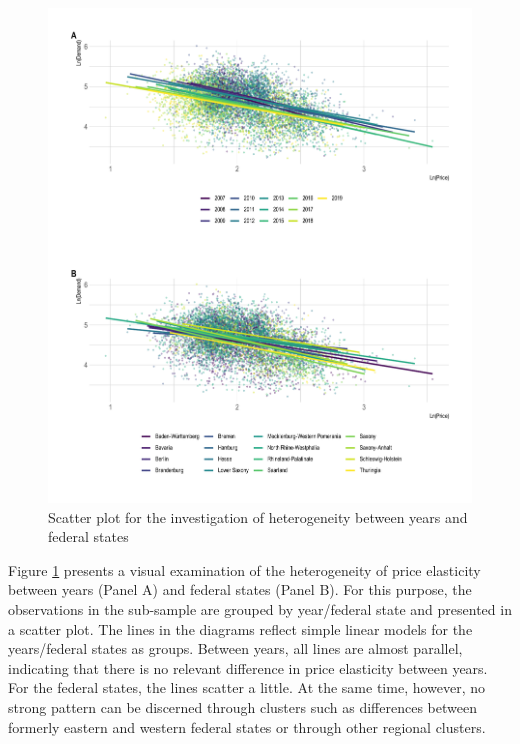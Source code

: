 \documentclass[12pt,twoside]{reedthesis}
\begin{document}
\newpage
\begin{figure}

{\centering \includegraphics[width=1\linewidth]{figure/year_state_heterogeneity_plot} 

}

\caption{Scatter plot for the investigation of heterogeneity between years and federal states}\label{fig:heterogeneity-year-state-plot}
\end{figure}
\noindent
Figure \ref{fig:heterogeneity-year-state-plot} presents a visual examination of the heterogeneity of price elasticity between years (Panel A) and federal states (Panel B). For this purpose, the observations in the sub-sample are grouped by year/federal state and presented in a scatter plot. The lines in the diagrams reflect simple linear models for the years/federal states as groups. Between years, all lines are almost parallel, indicating that there is no relevant difference in price elasticity between years. For the federal states, the lines scatter a little. At the same time, however, no strong pattern can be discerned through clusters such as differences between formerly eastern and western federal states or through other regional clusters.
\end{document}
